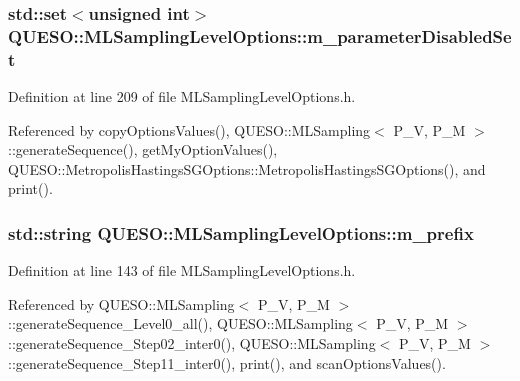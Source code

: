 \hypertarget{class_q_u_e_s_o_1_1_m_l_sampling_level_options_a0c5c308a5b9e0150be59ad52a48e6ab9}{
\subsubsection[{m\-\_\-parameter\-Disabled\-Set}]{\setlength{\rightskip}{0pt plus 5cm}std\-::set$<$unsigned int$>$ Q\-U\-E\-S\-O\-::\-M\-L\-Sampling\-Level\-Options\-::m\-\_\-parameter\-Disabled\-Set}}\label{class_q_u_e_s_o_1_1_m_l_sampling_level_options_a0c5c308a5b9e0150be59ad52a48e6ab9}


Definition at line 209 of file M\-L\-Sampling\-Level\-Options.\-h.



Referenced by copy\-Options\-Values(), Q\-U\-E\-S\-O\-::\-M\-L\-Sampling$<$ P\-\_\-\-V, P\-\_\-\-M $>$\-::generate\-Sequence(), get\-My\-Option\-Values(), Q\-U\-E\-S\-O\-::\-Metropolis\-Hastings\-S\-G\-Options\-::\-Metropolis\-Hastings\-S\-G\-Options(), and print().

\hypertarget{class_q_u_e_s_o_1_1_m_l_sampling_level_options_a4423067de3fa689d820abeba4dc5babc}{
\subsubsection[{m\-\_\-prefix}]{\setlength{\rightskip}{0pt plus 5cm}std\-::string Q\-U\-E\-S\-O\-::\-M\-L\-Sampling\-Level\-Options\-::m\-\_\-prefix}}\label{class_q_u_e_s_o_1_1_m_l_sampling_level_options_a4423067de3fa689d820abeba4dc5babc}


Definition at line 143 of file M\-L\-Sampling\-Level\-Options.\-h.



Referenced by Q\-U\-E\-S\-O\-::\-M\-L\-Sampling$<$ P\-\_\-\-V, P\-\_\-\-M $>$\-::generate\-Sequence\-\_\-\-Level0\-\_\-all(), Q\-U\-E\-S\-O\-::\-M\-L\-Sampling$<$ P\-\_\-\-V, P\-\_\-\-M $>$\-::generate\-Sequence\-\_\-\-Step02\-\_\-inter0(), Q\-U\-E\-S\-O\-::\-M\-L\-Sampling$<$ P\-\_\-\-V, P\-\_\-\-M $>$\-::generate\-Sequence\-\_\-\-Step11\-\_\-inter0(), print(), and scan\-Options\-Values().

